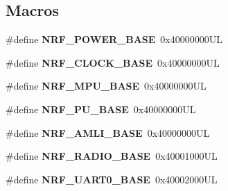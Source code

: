 \subsection*{Macros}
\begin{DoxyCompactItemize}
\item 
\hypertarget{group___device___peripheral___registers_ga3b41e88094fe622cbaea297633abd90b}{}\#define {\bfseries N\+R\+F\+\_\+\+P\+O\+W\+E\+R\+\_\+\+B\+A\+S\+E}~0x40000000\+U\+L\label{group___device___peripheral___registers_ga3b41e88094fe622cbaea297633abd90b}

\item 
\hypertarget{group___device___peripheral___registers_gae90dc399461ec8b2fcd74bcef0520755}{}\#define {\bfseries N\+R\+F\+\_\+\+C\+L\+O\+C\+K\+\_\+\+B\+A\+S\+E}~0x40000000\+U\+L\label{group___device___peripheral___registers_gae90dc399461ec8b2fcd74bcef0520755}

\item 
\hypertarget{group___device___peripheral___registers_ga85feffaabba805ab927a4e718ccd5cfd}{}\#define {\bfseries N\+R\+F\+\_\+\+M\+P\+U\+\_\+\+B\+A\+S\+E}~0x40000000\+U\+L\label{group___device___peripheral___registers_ga85feffaabba805ab927a4e718ccd5cfd}

\item 
\hypertarget{group___device___peripheral___registers_gaa4046599a67cf85f967db023b27a5570}{}\#define {\bfseries N\+R\+F\+\_\+\+P\+U\+\_\+\+B\+A\+S\+E}~0x40000000\+U\+L\label{group___device___peripheral___registers_gaa4046599a67cf85f967db023b27a5570}

\item 
\hypertarget{group___device___peripheral___registers_ga0212f0c04b019628db26382826a44283}{}\#define {\bfseries N\+R\+F\+\_\+\+A\+M\+L\+I\+\_\+\+B\+A\+S\+E}~0x40000000\+U\+L\label{group___device___peripheral___registers_ga0212f0c04b019628db26382826a44283}

\item 
\hypertarget{group___device___peripheral___registers_gab3ff49acc6b18ba217cc00d0d7b03bab}{}\#define {\bfseries N\+R\+F\+\_\+\+R\+A\+D\+I\+O\+\_\+\+B\+A\+S\+E}~0x40001000\+U\+L\label{group___device___peripheral___registers_gab3ff49acc6b18ba217cc00d0d7b03bab}

\item 
\hypertarget{group___device___peripheral___registers_gace85ffd3f00872f42720602aa934a222}{}\#define {\bfseries N\+R\+F\+\_\+\+U\+A\+R\+T0\+\_\+\+B\+A\+S\+E}~0x40002000\+U\+L\label{group___device___peripheral___registers_gace85ffd3f00872f42720602aa934a222}


\end{DoxyCompactItemize}
